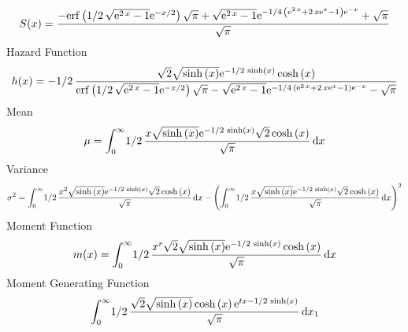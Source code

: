 \documentclass[12pt]{article}
\begin{document}
 $$ S(x)={\frac {-{\rm erf} \left(1/2\,\sqrt {{{\rm e}^{2\,x}}-1}{{\rm e}^{-x/2
}}\right)\sqrt {\pi}+\sqrt {{{\rm e}^{2\,x}}-1}{{\rm e}^{-1/4\,
 \left( {{\rm e}^{2\,x}}+2\,x{{\rm e}^{x}}-1 \right) {{\rm e}^{-x}}}}+
\sqrt {\pi}}{\sqrt {\pi}}}
$$ Hazard Function 
 $$ h(x)=-1/2\,{\frac {\sqrt {2}\sqrt {\sinh \left( x \right) }{{\rm e}^{-1/2\,
\sinh \left( x \right) }}\cosh \left( x \right) }{{\rm erf} \left(1/2
\,\sqrt {{{\rm e}^{2\,x}}-1}{{\rm e}^{-x/2}}\right)\sqrt {\pi}-\sqrt {
{{\rm e}^{2\,x}}-1}{{\rm e}^{-1/4\, \left( {{\rm e}^{2\,x}}+2\,x{
{\rm e}^{x}}-1 \right) {{\rm e}^{-x}}}}-\sqrt {\pi}}}
$$Mean 
 $$ \mu=\int_{0}^{\infty }\!1/2\,{\frac {x\sqrt {\sinh \left( x \right) }{
{\rm e}^{-1/2\,\sinh \left( x \right) }}\sqrt {2}\cosh \left( x
 \right) }{\sqrt {\pi}}}\,{\rm d}x
$$ Variance 
 $$ \sigma^2 = \int_{0}^{\infty }\!1/2\,{\frac {{x}^{2}\sqrt {\sinh \left( x \right) 
}{{\rm e}^{-1/2\,\sinh \left( x \right) }}\sqrt {2}\cosh \left( x
 \right) }{\sqrt {\pi}}}\,{\rm d}x- \left( \int_{0}^{\infty }\!1/2\,{
\frac {x\sqrt {\sinh \left( x \right) }{{\rm e}^{-1/2\,\sinh \left( x
 \right) }}\sqrt {2}\cosh \left( x \right) }{\sqrt {\pi}}}\,{\rm d}x
 \right) ^{2}
$$Moment Function 
 $$ m(x) = \int_{0}^{\infty }\!1/2\,{\frac {{x}^{r}\sqrt {2}\sqrt {\sinh \left( x
 \right) }{{\rm e}^{-1/2\,\sinh \left( x \right) }}\cosh \left( x
 \right) }{\sqrt {\pi}}}\,{\rm d}x
$$ Moment Generating Function 
 $$\int_{0}^{\infty }\!1/2\,{\frac {\sqrt {2}\sqrt {\sinh \left( x
 \right) }\cosh \left( x \right) {{\rm e}^{tx-1/2\,\sinh \left( x
 \right) }}}{\sqrt {\pi}}}\,{\rm d}x_{{1}}
$$
\end{document}
